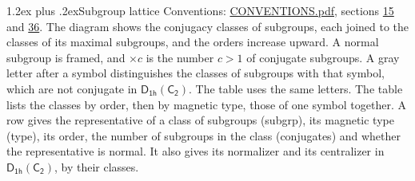 \documentclass[10pt,a4paper]{article}
\makeatletter
\renewcommand\section{\@startsection{section}{1}{\z@}{-3ex plus -1ex minus -.2ex}%
  {1.2ex plus .2ex}{\normalfont\large\sffamily\bfseries\color{parttitle}}}
\numberwithin{equation}{section}
\newcommand{\grp}[1]{\mathsf{#1}}
\newcommand{\clsletter}[1]{\,{\scriptsize\color{black!55}#1}}
\makeatother
\begin{document}
\section{Subgroup lattice}\label{s:subgroups}
Conventions: \href{../../CONVENTIONS.pdf}{CONVENTIONS.pdf}, sections \href{../../../rotation/CONVENTIONS.pdf\#conv.15}{15} and \href{../../CONVENTIONS.pdf\#conv.36}{36}.
The diagram shows the conjugacy classes of subgroups, each joined to the classes of its maximal subgroups, and the orders increase upward. \label{n:index.conjugates.c}A normal subgroup is framed, and ${\times}c$ is the number $c > 1$ of conjugate subgroups. \label{n:mark.letter}A gray letter after a symbol distinguishes the classes of subgroups with that symbol, which are not conjugate in $\grp{D_{1h}}(\grp{C_{2}})$. The table uses the same letters. The table lists the classes by order, then by magnetic type, those of one symbol together. \label{n:head.subgroup}\label{n:head.magnetic.type}\label{n:head.order}\label{n:head.conjugates}\label{n:head.normal}A row gives the representative of a class of subgroups (subgrp), its magnetic type (type), its order, the number of subgroups in the class (conjugates) and whether the representative is normal. \label{n:head.normalizer}\label{n:head.centralizer}It also gives its normalizer and its centralizer in $\grp{D_{1h}}(\grp{C_{2}})$, by their classes. 
\begin{center}
\end{center}
\end{document}

